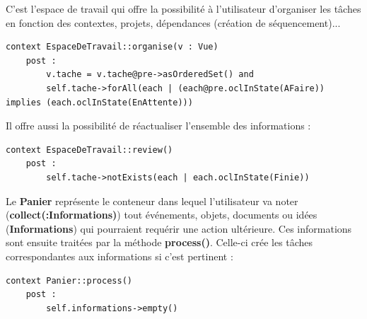 	C'est l'espace de travail qui offre la possibilité à l'utilisateur d'organiser les tâches en fonction des contextes, projets, dépendances (création de séquencement)...
\begin{lstlisting}
context EspaceDeTravail::organise(v : Vue)
	post :
		v.tache = v.tache@pre->asOrderedSet() and
		self.tache->forAll(each | (each@pre.oclInState(AFaire)) implies (each.oclInState(EnAttente)))
\end{lstlisting}

	Il offre aussi la possibilité de réactualiser l'ensemble des informations :
\begin{lstlisting}
context EspaceDeTravail::review()
	post :
		self.tache->notExists(each | each.oclInState(Finie))
\end{lstlisting}

	Le \textbf{Panier} représente le conteneur dans lequel l'utilisateur va noter (\textbf{collect(:Informations)}) tout événements, objets, documents ou idées (\textbf{Informations}) qui pourraient requérir une action ultérieure. Ces informations sont ensuite traitées par la méthode \textbf{process()}. Celle-ci crée les tâches correspondantes aux informations si c'est pertinent :
\begin{lstlisting}
context Panier::process()
	post :
		self.informations->empty()
\end{lstlisting}